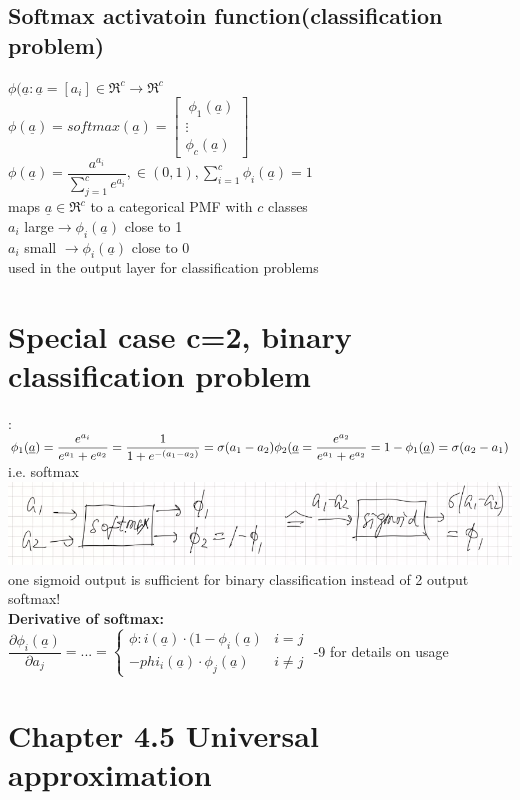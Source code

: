  \subsection{Softmax activatoin function(classification problem)}
 $  \phi (\underline{a} : \underline{a}  = [a_i ] \in \Re^c \rightarrow \Re^c$ \\
 $  \phi ( \underline{a}) = softmax (\underline{a}) = \left[
 \begin{matrix} 
\  \phi_1 (\underline{a}) \\
  \vdots \\
  \phi_c (\underline{a})
 \end{matrix} \right] $ \\
 $ \phi (\underline{a}) = \dfrac{ a^{a_i}}{\sum_{j=1}^{c} e^{a_i }} , \in (0,1) , \sum_{i=1}^{c} \phi_i (\underline{a}) = 1 $ \\
 \textbullet maps $  \underline{a} \in \Re^c  $ to a categorical PMF with $ c $ classes  \\
 \textbullet $  a_i  $ large$  \rightarrow \phi_i (\underline{a} )  $ close to 1 \\
 \textbullet $  a_i  $ small $ \rightarrow \phi_i (\underline{a} )  $ close to 0 \\
 \textbullet used in the output layer for classification problems \\
 \section{Special case c=2, binary classification problem}:
 $ \phi_1 (\underline{a}) = \dfrac{e^{a_i}}{e^{a_1} + e^{a_2}} = \dfrac{1}{1+ e^{-(a_1 - a_2)}} = \sigma (a_1 - a _ 2) \\
 \phi_2 (\underline{a} = \dfrac{e^{a_2}}{e^{a_1} + e^{a_2}} = 1 - \phi_1 (\underline{a}) = \sigma (a_2 - a_1) \\
 $
 i.e. softmax \\
 \includegraphics[width=\linewidth]{Images/OutputLayerSoftmax.png} \\
  one sigmoid output is sufficient for binary classification instead of 2 output softmax! \\
\textbf{  Derivative of softmax:}\\
  $ \dfrac{ \partial \phi_i (\underline{a}) }{\partial a_j} = ... = \left\lbrace \begin{array}{lc}
\phi:i (\underline{a})\cdot ( 1- \phi_i (\underline{a}) & i=j \\
- phi_i (\underline{a}) \cdot \phi_j (\underline{a}) & i \neq j 
  \end{array} \right. $
  -9 for details on usage \\
  \section{Chapter 4.5 Universal approximation } 
  